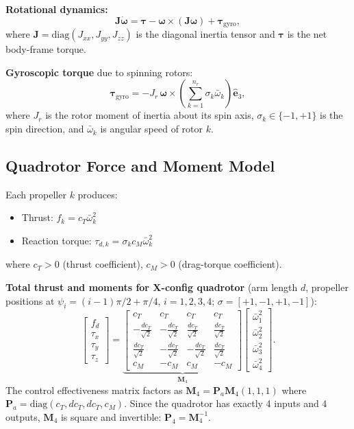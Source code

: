 \documentclass[11pt,a4paper]{article}
\newcommand{\vect}[1]{\bm{#1}}
\newcommand{\diag}{\mathrm{diag}}
\begin{document}
\textbf{Rotational dynamics:}
\[
\mathbf{J}\dot{\vect{\omega}} = \vect{\tau} - \vect{\omega}\times(\mathbf{J}\vect{\omega}) + \vect{\tau}_{\mathrm{gyro}},
\]
where $\mathbf{J}=\diag(J_{xx},J_{yy},J_{zz})$ is the diagonal inertia tensor and $\vect\tau$ is the net body-frame torque.

\textbf{Gyroscopic torque} due to spinning rotors:
\[
\vect{\tau}_{\mathrm{gyro}} = -J_r\,\vect{\omega}\times\!\left(\sum_{k=1}^{n_r}\sigma_k\bar\omega_k\right)\hat{\vect{e}}_3,
\]
where $J_r$ is the rotor moment of inertia about its spin axis, $\sigma_k\in\{-1,+1\}$ is the spin direction, and $\bar\omega_k$ is angular speed of rotor $k$.

\subsection{Quadrotor Force and Moment Model}

Each propeller $k$ produces:
\begin{itemize}
  \item Thrust: $f_k = c_T\bar\omega_k^2$
  \item Reaction torque: $\tau_{d,k} = \sigma_k c_M\bar\omega_k^2$
\end{itemize}
where $c_T>0$ (thrust coefficient), $c_M>0$ (drag-torque coefficient).

\textbf{Total thrust and moments for X-config quadrotor} (arm length $d$, propeller positions at $\psi_i=(i-1)\pi/2+\pi/4$, $i=1,2,3,4$; $\sigma=[+1,-1,+1,-1]$):
\[
\begin{bmatrix}f_d\\\tau_x\\\tau_y\\\tau_z\end{bmatrix}
= \underbrace{
\begin{bmatrix}
c_T & c_T & c_T & c_T \\
-\tfrac{dc_T}{\sqrt{2}} & -\tfrac{dc_T}{\sqrt{2}} & \tfrac{dc_T}{\sqrt{2}} & \tfrac{dc_T}{\sqrt{2}} \\
\tfrac{dc_T}{\sqrt{2}} & -\tfrac{dc_T}{\sqrt{2}} & -\tfrac{dc_T}{\sqrt{2}} & \tfrac{dc_T}{\sqrt{2}} \\
c_M & -c_M & c_M & -c_M
\end{bmatrix}
}_{\mathbf{M}_4}
\begin{bmatrix}\bar\omega_1^2\\\bar\omega_2^2\\\bar\omega_3^2\\\bar\omega_4^2\end{bmatrix}.
\]
The control effectiveness matrix factors as $\mathbf{M}_4 = \mathbf{P}_a\mathbf{M}_4(1,1,1)$ where $\mathbf{P}_a = \diag(c_T, dc_T, dc_T, c_M)$.
Since the quadrotor has exactly 4 inputs and 4 outputs, $\mathbf{M}_4$ is square and invertible: $\mathbf{P}_4 = \mathbf{M}_4^{-1}$.
\end{document}

